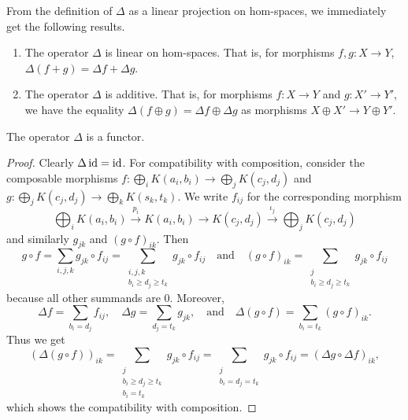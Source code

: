 From the definition of $\Delta$ as a linear projection on hom-spaces, we immediately get the following results.

\begin{proposition}
\label{C!P:Delta-linear}
\label{C!P:Delta-additive}
  \begin{enumerate}
    \item The operator $\Delta$ is linear on hom-spaces. That is, for morphisms $f, g \colon X \to Y$, $\Delta(f + g) = \Delta f + \Delta g$.
    \item The operator $\Delta$ is additive. That is, for morphisms $f \colon X \to Y$ and $g \colon X' \to Y'$, we have the equality $\Delta(f \oplus g) = \Delta f \oplus \Delta g$ as morphisms $X \oplus X' \to Y \oplus Y'$.
  \end{enumerate}
\end{proposition}

\begin{proposition}
\label{C!P:Delta-functor}
  The operator $\Delta$ is a functor.
\end{proposition}

\begin{proof}
  Clearly $\Delta \operatorname{id} = \operatorname{id}$. For compatibility with composition, consider the composable morphisms $f \colon \bigoplus_i K(a_i, b_i) \to \bigoplus_j K(c_j, d_j)$ and $g \colon \bigoplus_j K(c_j, d_j) \to \bigoplus_k K(s_k, t_k)$. We write $f_{ij}$ for the corresponding morphism
  \[
    \bigoplus_i K(a_i, b_i) \xrightarrow{p_i} K(a_i, b_i) \to K(c_j, d_j) \xrightarrow{\iota_j} \bigoplus_j K(c_j, d_j)
  \]
  and similarly $g_{jk}$ and $(g \circ f)_{ik}$. Then
  \[
    g \circ f = \sum_{i, j, k} g_{jk} \circ f_{ij} = \sum_{\substack{i, j, k \\ b_i \geq d_j \geq t_k}} g_{jk} \circ f_{ij}
    \quad \text{and} \quad
    (g \circ f)_{ik} = \sum_{\substack{j \\ b_i \geq d_j \geq t_k}} g_{jk} \circ f_{ij}
  \]
  because all other summands are $0$. Moreover,
  \[
    \Delta f = \sum_{b_i = d_j} f_{ij},
    \quad
    \Delta g = \sum_{d_j = t_k} g_{jk},
    \quad \text{and} \quad
    \Delta (g \circ f) = \sum_{b_i = t_k} (g \circ f)_{ik}.
  \]
  Thus we get
  \[
    (\Delta (g \circ f))_{ik} = \sum_{\substack{j \\ b_i \geq d_j \geq t_k \\ b_i = t_k}} g_{jk} \circ f_{ij} = \sum_{\substack{j \\ b_i = d_j = t_k}} g_{jk} \circ f_{ij} = (\Delta g \circ \Delta f)_{ik},
  \]
  which shows the compatibility with composition.
\end{proof}

